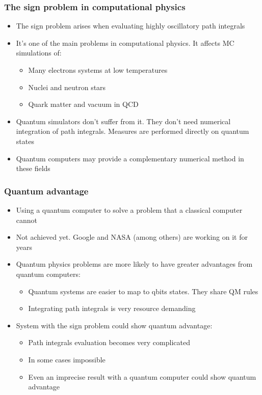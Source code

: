 \documentclass[10pt,t,xcolor=dvipsnames,aspectratio=169]{beamer}
\begin{document}
\begin{frame}
    \frametitle{The sign problem in computational physics}
    \begin{itemize}
        \item
            The sign problem arises when evaluating highly oscillatory path integrals
        \item
            It's one of the main problems in computational physics.
            It affects MC simulations of:
            \begin{itemize}
                \item Many electrons systems at low temperatures
                \item Nuclei and neutron stars
                \item Quark matter and vacuum in QCD
            \end{itemize}
        \item
            Quantum simulators don't suffer from it.
            They don't need numerical integration of path integrals.
            Measures are performed directly on quantum states
        \item
            Quantum computers may provide a complementary numerical method in these fields
    \end{itemize}
\end{frame}

\begin{frame}
    \frametitle{Quantum advantage}
    \begin{itemize}
        \item
            Using a quantum computer to solve a problem that a classical computer cannot
        \item
            Not achieved yet. Google and NASA (among others) are working on it for years
        \item
            Quantum physics problems are more likely to have greater advantages from quantum computers:
            \begin{itemize}
                \item Quantum systems are easier to map to qbits states. They share QM rules
                \item Integrating path integrals is very resource demanding
            \end{itemize}
        \item
            System with the sign problem could show quantum advantage:
            \begin{itemize}
                \item Path integrals evaluation becomes very complicated
                \item In some cases impossible
                \item Even an imprecise result with a quantum computer could show quantum advantage
            \end{itemize}
    \end{itemize}
\end{frame}
\end{document}
